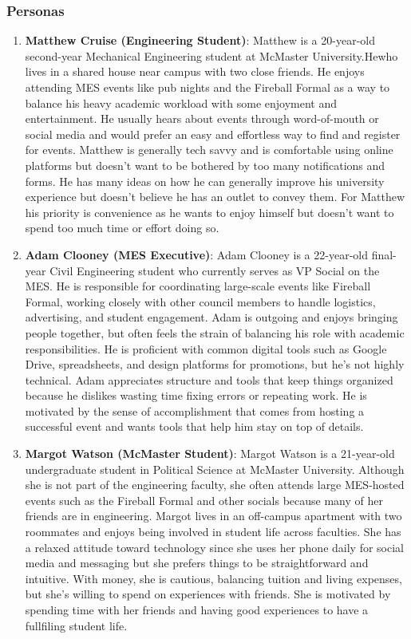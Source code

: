 \documentclass[12pt]{article}
\begin{document}
\subsubsection{Personas}
\begin{enumerate}
  \item \textbf{Matthew Cruise (Engineering Student)}: Matthew is a 20-year-old second-year Mechanical Engineering student at McMaster University.Hewho lives in a shared house near campus with two close friends. He enjoys attending MES events like pub nights and the Fireball Formal as a way to balance his heavy academic workload with some enjoyment and entertainment. He usually hears about events through word-of-mouth or social media and would prefer an easy and effortless way to find and register for events. Matthew is generally tech savvy and is comfortable using online platforms but doesn't want to be bothered by too many notifications and forms. He has many ideas on how he can generally improve his university experience but doesn't believe he has an outlet to convey them. For Matthew his priority is convenience as he wants to enjoy himself but doesn't want to spend too much time or effort doing so.
  \item \textbf{Adam Clooney (MES Executive)}: Adam Clooney is a 22-year-old final-year Civil Engineering student who currently serves as VP Social on the MES. He is responsible for coordinating large-scale events like Fireball Formal, working closely with other council members to handle logistics, advertising, and student engagement. Adam is outgoing and enjoys bringing people together, but often feels the strain of balancing his role with academic responsibilities. He is proficient with common digital tools such as Google Drive, spreadsheets, and design platforms for promotions, but he’s not highly technical. Adam appreciates structure and tools that keep things organized because he dislikes wasting time fixing errors or repeating work. He is motivated by the sense of accomplishment that comes from hosting a successful event and wants tools that help him stay on top of details.
  \item \textbf{Margot Watson (McMaster Student)}: Margot Watson is a 21-year-old undergraduate student in Political Science at McMaster University. Although she is not part of the engineering faculty, she often attends large MES-hosted events such as the Fireball Formal and other socials because many of her friends are in engineering. Margot lives in an off-campus apartment with two roommates and enjoys being involved in student life across faculties. She has a relaxed attitude toward technology since she uses her phone daily for social media and messaging but she prefers things to be straightforward and intuitive. With money, she is cautious, balancing tuition and living expenses, but she’s willing to spend on experiences with friends. She is motivated by spending time with her friends and having good experiences to have a fullfiling student life.
\end{enumerate}
\end{document}
